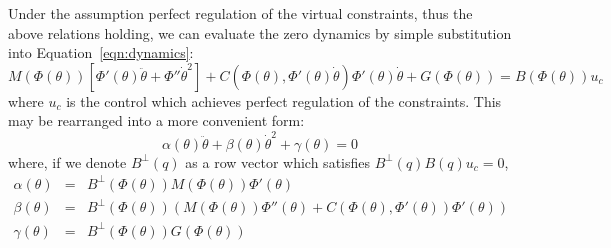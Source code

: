 Under the assumption perfect regulation of the virtual constraints, thus the above relations holding, we can evaluate the zero dynamics by simple substitution into Equation~\ref{eqn:dynamics}:
\begin{equation}
	M\left(\Phi(\theta)\right)\left[\Phi'(\theta)\ddot{\theta} + \Phi''\dot{\theta}^2\right] + 
	C\left(\Phi(\theta),\Phi'(\theta)\dot{\theta}\right)\Phi'(\theta)\dot{\theta} +
	G\left(\Phi(\theta)\right) = B\left(\Phi(\theta)\right)u_c
\end{equation}
where $u_c$ is the control which achieves perfect regulation of the constraints. This may be rearranged into a more convenient form:
\begin{equation} \label{eqn:zerodyn}
	\alpha(\theta)\ddot{\theta} + \beta(\theta)\dot{\theta}^2 + \gamma(\theta) = 0
\end{equation}
where, if we denote $B^{\perp}(q)$ as a row vector which satisfies $B^{\perp}(q)B(q)u_c = 0$,
\begin{eqnarray}
	\alpha(\theta) &=& B^{\bot}\left(\Phi(\theta)\right)M\left(\Phi(\theta)\right)\Phi'(\theta)\nonumber \\
	\beta(\theta) &=& B^{\bot}\left(\Phi(\theta)\right)\left(M\left(\Phi(\theta)\right)\Phi''(\theta)
		+C\left(\Phi(\theta),\Phi'(\theta)\right)\Phi'(\theta) \right) \nonumber \\
	\gamma(\theta) &=& B^{\bot}\left(\Phi(\theta)\right)G\left(\Phi(\theta)\right)
\end{eqnarray}

